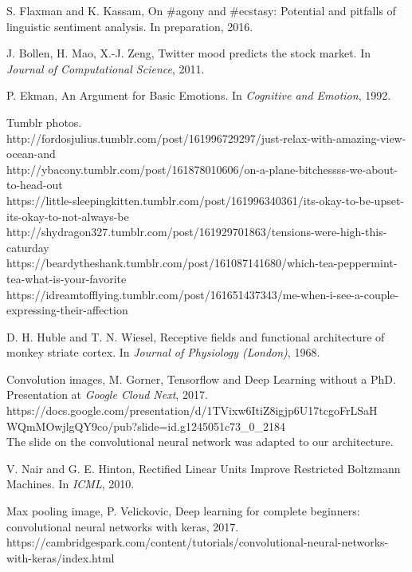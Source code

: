 \begin{thebibliography}{999}

S. Flaxman and K. Kassam, On \#agony and \#ecstasy: Potential and pitfalls of linguistic sentiment analysis. In preparation, 2016.

J. Bollen, H. Mao, X.-J. Zeng, Twitter mood predicts the stock market. In \textit{Journal of Computational Science}, 2011.

P. Ekman, An Argument for Basic Emotions. In \textit{Cognitive and Emotion}, 1992.

Tumblr photos.\\
http://fordosjulius.tumblr.com/post/161996729297/just-relax-with-amazing-view-ocean-and\\
http://ybacony.tumblr.com/post/161878010606/on-a-plane-bitchessss-we-about-to-head-out\\
https://little-sleepingkitten.tumblr.com/post/161996340361/its-okay-to-be-upset-its-okay-to-not-always-be\\
http://shydragon327.tumblr.com/post/161929701863/tensions-were-high-this-caturday\\
https://beardytheshank.tumblr.com/post/161087141680/which-tea-peppermint-tea-what-is-your-favorite\\
https://idreamtofflying.tumblr.com/post/161651437343/me-when-i-see-a-couple-expressing-their-affection

D. H. Huble and T. N. Wiesel, Receptive fields and functional architecture of monkey striate cortex. In \textit{Journal of Physiology (London)}, 1968.

Convolution images, M. Gorner, Tensorflow and Deep Learning without a PhD. Presentation at \textit{Google Cloud Next}, 2017.\\ 
https://docs.google.com/presentation/d/1TVixw6ItiZ8igjp6U17tcgoFrLSaH\\WQmMOwjlgQY9co/pub?slide=id.g1245051c73\_0\_2184\\
The slide on the convolutional neural network was adapted to our architecture.

V. Nair and G. E. Hinton, Rectified Linear Units Improve Restricted Boltzmann Machines. In \textit{ICML}, 2010.

Max pooling image, P. Velickovic, 
Deep learning for complete beginners: convolutional neural networks with keras, 2017.\\
https://cambridgespark.com/content/tutorials/convolutional-neural-networks-with-keras/index.html


\end{thebibliography}

